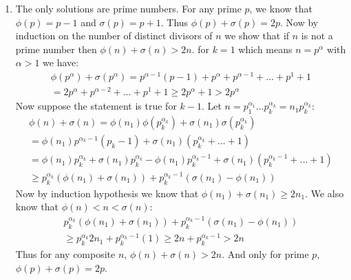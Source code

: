 \begin{enumerate}[label=]
    \item
        The only solutions are prime numbers. For any prime $p$, we know that $\phi(p) = p - 1$ and $\sigma(p) = p + 1$. Thus $\phi(p) + \sigma(p) = 2p$. Now by induction on the number of distinct divisors of $n$ we show that if $n$ is not a prime number then $\phi(n) + \sigma(n) > 2n$.
        for $k = 1$ which means $n = p^\alpha$ with $\alpha > 1$ we have:
        \begin{gather*}
            \phi(p^\alpha) + \sigma(p^\alpha) = p^{\alpha - 1}(p - 1) + p^\alpha + p^{\alpha - 1} + \dots + p^1 + 1 \\
            = 2p^\alpha + p^{\alpha - 2} + \dots + p^1 + 1 \ge 2p^\alpha + 1 > 2p^\alpha
        \end{gather*}
        Now suppose the statement is true for $k - 1$. Let $n = p_1^{\alpha_1} \dots p_k^{\alpha_k} = n_1 p_k^{\alpha_k}$:
        \begin{gather*}
            \phi(n) + \sigma(n) = \phi(n_1) \phi(p_k^{\alpha_k}) + \sigma(n_1) \sigma(p_k^{\alpha_k}) \\
            = \phi(n_1) p^{\alpha_k - 1}(p_k - 1) + \sigma(n_1) (p_k^{\alpha_k} + \dots + 1) \\
            = \phi(n_1)p_k^{\alpha_k} + \sigma(n_1) p_k^{\alpha_k} - \phi(n_1) p_k^{\alpha_k - 1} + \sigma(n_1) (p_k^{\alpha_k - 1} + \dots + 1) \\
            \ge p_k^{\alpha_k} (\phi(n_1) + \sigma(n_1)) + p_k^{\alpha_k - 1}(\sigma(n_1) - \phi(n_1)) 
        \end{gather*}
        Now by induction hypothesis we know that $\phi(n_1) + \sigma(n_1) \ge 2n_1$. We also know that $\phi(n) < n < \sigma(n)$:
        \begin{gather*}
            p_k^{\alpha_k} (\phi(n_1) + \sigma(n_1)) + p_k^{\alpha_k - 1}(\sigma(n_1) - \phi(n_1)) \\
            \ge p_k^{\alpha_k} 2n_1 + p_k^{\alpha_k - 1} (1) \ge 2n + p_k^{\alpha_k - 1} > 2n
        \end{gather*}
        Thus for any composite $n$, $\phi(n) + \sigma(n) > 2n$. And only for prime $p$, $\phi(p) + \sigma(p) = 2p$.
\end{enumerate}